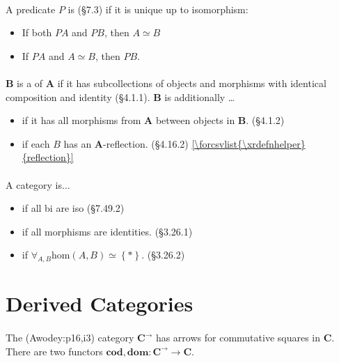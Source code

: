 \documentclass[10pt,twocolumn,letterpaper]{article}
\newcommand{\set}[1]{\left\{{#1}\right\}}
\newcommand\xrdefnhelper[1]{defn:#1}
\newcommand{\xrdefn}[1]{\ref{\forcsvlist{\xrdefnhelper}{#1}}}
\begin{document}
  \paragraph{}
  A predicate $P$ is  (\S7.3) if it is unique up to
  isomorphism:
  \begin{itemize}
    \item If both $PA$ and $PB$, then $A \simeq B$
    \item If $PA$ and $A \simeq B$, then $PB$.
  \end{itemize}

  \paragraph{}
  $\mathbf{B}$ is a  of $\mathbf{A}$ if it has
  subcollections of objects and morphisms with identical composition and
  identity (\S4.1.1).  $\mathbf{B}$ is additionally \dots
  \begin{itemize}
	\item {} if it has all morphisms from $\mathbf{A}$
	      between objects in $\mathbf{B}$. (\S4.1.2) 
	\item {} if each $B$ has an $\mathbf{A}$-reflection. (\S4.16.2)
	      \xrdefn{reflection}
  \end{itemize}

  \paragraph{}
  A category is$\dots$
  \begin{itemize}
    \item {} if all bi are iso (\S7.49.2)
    \item {} if all morphisms are identities. (\S3.26.1)
    \item {} if $\forall_{A,B} \mbox{hom}(A,B) \simeq \set{*}$. (\S3.26.2)
  \end{itemize}

\section{Derived Categories} %

  \paragraph{}
  The  (Awodey:p16,i3) category $\mathbf{C}^\to$ has arrows for
  commutative squares in $\mathbf{C}$.  There are two functors
  $\mathbf{cod}, \mathbf{dom} : \mathbf{C}^\to \to \mathbf{C}$.
\end{document}
